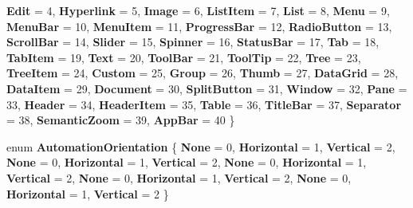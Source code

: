 \begin{DoxyCompactItemize}
\newline
{\bfseries Edit} = 4, 
{\bfseries Hyperlink} = 5, 
{\bfseries Image} = 6, 
{\bfseries List\+Item} = 7, 
\newline
{\bfseries List} = 8, 
{\bfseries Menu} = 9, 
{\bfseries Menu\+Bar} = 10, 
{\bfseries Menu\+Item} = 11, 
\newline
{\bfseries Progress\+Bar} = 12, 
{\bfseries Radio\+Button} = 13, 
{\bfseries Scroll\+Bar} = 14, 
{\bfseries Slider} = 15, 
\newline
{\bfseries Spinner} = 16, 
{\bfseries Status\+Bar} = 17, 
{\bfseries Tab} = 18, 
{\bfseries Tab\+Item} = 19, 
\newline
{\bfseries Text} = 20, 
{\bfseries Tool\+Bar} = 21, 
{\bfseries Tool\+Tip} = 22, 
{\bfseries Tree} = 23, 
\newline
{\bfseries Tree\+Item} = 24, 
{\bfseries Custom} = 25, 
{\bfseries Group} = 26, 
{\bfseries Thumb} = 27, 
\newline
{\bfseries Data\+Grid} = 28, 
{\bfseries Data\+Item} = 29, 
{\bfseries Document} = 30, 
{\bfseries Split\+Button} = 31, 
\newline
{\bfseries Window} = 32, 
{\bfseries Pane} = 33, 
{\bfseries Header} = 34, 
{\bfseries Header\+Item} = 35, 
\newline
{\bfseries Table} = 36, 
{\bfseries Title\+Bar} = 37, 
{\bfseries Separator} = 38, 
{\bfseries Semantic\+Zoom} = 39, 
\newline
{\bfseries App\+Bar} = 40
 \}
\item 
\mbox{\label{namespace_windows_1_1_u_i_1_1_xaml_1_1_automation_1_1_peers_a7279523ced8212af46486c324a89ee2b}} 
enum {\bfseries Automation\+Orientation} \{ \newline
{\bfseries None} = 0, 
{\bfseries Horizontal} = 1, 
{\bfseries Vertical} = 2, 
{\bfseries None} = 0, 
\newline
{\bfseries Horizontal} = 1, 
{\bfseries Vertical} = 2, 
{\bfseries None} = 0, 
{\bfseries Horizontal} = 1, 
\newline
{\bfseries Vertical} = 2, 
{\bfseries None} = 0, 
{\bfseries Horizontal} = 1, 
{\bfseries Vertical} = 2, 
\newline
{\bfseries None} = 0, 
{\bfseries Horizontal} = 1, 
{\bfseries Vertical} = 2
 \}
\item 
\mbox{\label{namespace_windows_1_1_u_i_1_1_xaml_1_1_automation_1_1_peers_a3a01b3ce21eb110af096e897e16e1c78}} 

\end{DoxyCompactItemize}
